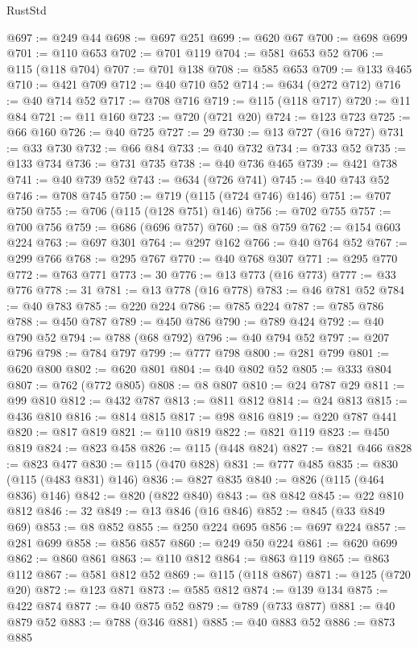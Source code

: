 \begin{lexlean}{RustStd}
\begin{coremodule}
@697 := @249 @44
@698 := @697 @251
@699 := @620 @67
@700 := @698 @699
@701 := @110 @653
@702 := @701 @119
@704 := @581 @653 @52
@706 := @115 (@118 @704)
@707 := @701 @138
@708 := @585 @653
@709 := @133 @465
@710 := @421 @709
@712 := @40 @710 @52
@714 := @634 (@272 @712)
@716 := @40 @714 @52
@717 := @708 @716
@719 := @115 (@118 @717)
@720 := @11 @84
@721 := @11 @160
@723 := @720 (@721 @20)
@724 := @123 @723
@725 := @66 @160
@726 := @40 @725
@727 := 29
@730 := @13 @727 (@16 @727)
@731 := @33 @730
@732 := @66 @84
@733 := @40 @732
@734 := @733 @52
@735 := @133 @734
@736 := @731 @735
@738 := @40 @736 @465
@739 := @421 @738
@741 := @40 @739 @52
@743 := @634 (@726 @741)
@745 := @40 @743 @52
@746 := @708 @745
@750 := @719 (@115 (@724 @746) @146)
@751 := @707 @750
@755 := @706 (@115 (@128 @751) @146)
@756 := @702 @755
@757 := @700 @756
@759 := @686 (@696 @757)
@760 := @8 @759
@762 := @154 @603 @224
@763 := @697 @301
@764 := @297 @162
@766 := @40 @764 @52
@767 := @299 @766
@768 := @295 @767
@770 := @40 @768 @307
@771 := @295 @770
@772 := @763 @771
@773 := 30
@776 := @13 @773 (@16 @773)
@777 := @33 @776
@778 := 31
@781 := @13 @778 (@16 @778)
@783 := @46 @781 @52
@784 := @40 @783
@785 := @220 @224
@786 := @785 @224
@787 := @785 @786
@788 := @450 @787
@789 := @450 @786
@790 := @789 @424
@792 := @40 @790 @52
@794 := @788 (@68 @792)
@796 := @40 @794 @52
@797 := @207 @796
@798 := @784 @797
@799 := @777 @798
@800 := @281 @799
@801 := @620 @800
@802 := @620 @801
@804 := @40 @802 @52
@805 := @333 @804
@807 := @762 (@772 @805)
@808 := @8 @807
@810 := @24 @787 @29
@811 := @99 @810
@812 := @432 @787
@813 := @811 @812
@814 := @24 @813
@815 := @436 @810
@816 := @814 @815
@817 := @98 @816
@819 := @220 @787 @441
@820 := @817 @819
@821 := @110 @819
@822 := @821 @119
@823 := @450 @819
@824 := @823 @458
@826 := @115 (@448 @824)
@827 := @821 @466
@828 := @823 @477
@830 := @115 (@470 @828)
@831 := @777 @485
@835 := @830 (@115 (@483 @831) @146)
@836 := @827 @835
@840 := @826 (@115 (@464 @836) @146)
@842 := @820 (@822 @840)
@843 := @8 @842
@845 := @22 @810 @812
@846 := 32
@849 := @13 @846 (@16 @846)
@852 := @845 (@33 @849 @69)
@853 := @8 @852
@855 := @250 @224 @695
@856 := @697 @224
@857 := @281 @699
@858 := @856 @857
@860 := @249 @50 @224
@861 := @620 @699
@862 := @860 @861
@863 := @110 @812
@864 := @863 @119
@865 := @863 @112
@867 := @581 @812 @52
@869 := @115 (@118 @867)
@871 := @125 (@720 @20)
@872 := @123 @871
@873 := @585 @812
@874 := @139 @134
@875 := @422 @874
@877 := @40 @875 @52
@879 := @789 (@733 @877)
@881 := @40 @879 @52
@883 := @788 (@346 @881)
@885 := @40 @883 @52
@886 := @873 @885

\end{coremodule}
\end{lexlean}
